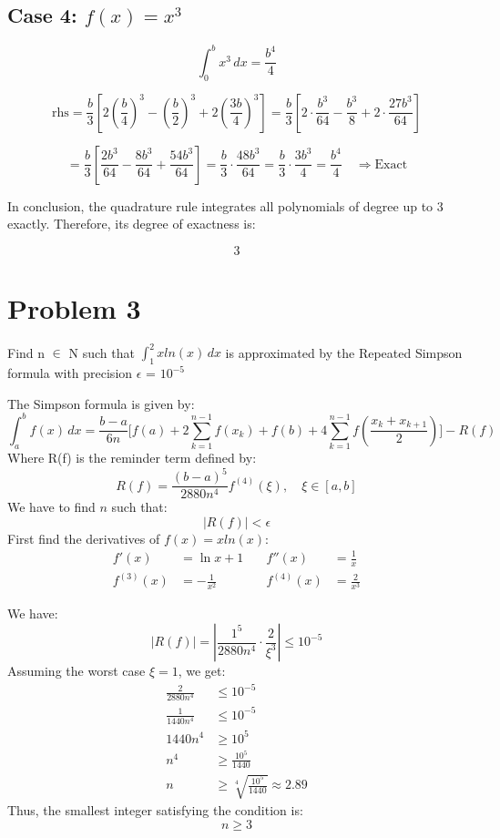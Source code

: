 \documentclass{article}
\begin{document}
\subsection*{Case 4: \( f(x) = x^3 \)}

\[
\int_{0}^{b} x^3\, dx = \frac{b^4}{4}
\]

\[
\text{rhs} = \frac{b}{3} \left[ 2\left( \frac{b}{4} \right)^3 - \left( \frac{b}{2} \right)^3 + 2\left( \frac{3b}{4} \right)^3 \right]
= \frac{b}{3} \left[ 2\cdot\frac{b^3}{64} - \frac{b^3}{8} + 2\cdot\frac{27b^3}{64} \right]
\]

\[
= \frac{b}{3} \left[ \frac{2b^3}{64} - \frac{8b^3}{64} + \frac{54b^3}{64} \right]
= \frac{b}{3} \cdot \frac{48b^3}{64} = \frac{b}{3} \cdot \frac{3b^3}{4}
= \frac{b^4}{4}
\quad \Rightarrow \text{Exact}
\]

In conclusion, the quadrature rule integrates all polynomials of degree up to 3 exactly. Therefore, its degree of exactness is:

\[
\boxed{3}
\]

\section*{Problem 3}
Find n \(\in\) N such that \( \int_{1}^{2} xln(x) \, dx \) is approximated by the Repeated Simpson formula with precision \(\epsilon\) = \(10^{-5}\)
\

The Simpson formula is given by:
\[
    \int_{a}^{b} f(x) \, dx = \frac{b-a}{6n} \bigg[f(a) + 2\sum_{k=1}^{n-1}f(x_k) + f(b) + 4\sum_{k=1}^{n-1}f(\frac{x_k + x_{k+1}}{2})\bigg] - R(f)
\]
Where R(f) is the reminder term defined by:
\[
    R(f) = \frac{(b-a)^5}{2880n^4}f^{(4)}(\xi), \quad \xi \in [a,b]
\]
We have to find \( n \) such that:
\[
    \big|R(f)\big| < \epsilon
\]
First find the derivatives of \( f(x) = xln(x) \):
\begin{align*}
f'(x) &= \ln x + 1 &\quad f''(x) &= \frac{1}{x} \\
f^{(3)}(x) &= -\frac{1}{x^2} &\quad f^{(4)}(x) &= \frac{2}{x^3}
\end{align*}

We have:
\[
    \left|R(f)\right| = \left| \frac{1^5}{2880n^4} \cdot \frac{2}{\xi^3} \right| \leq 10^{-5}
\]
Assuming the worst case \( \xi = 1 \), we get:
\begin{align*}
    \frac{2}{2880n^4} &\leq 10^{-5} \\
    \frac{1}{1440n^4} &\leq 10^{-5} \\
    1440n^4 &\geq 10^5 \\
    n^4 &\geq \frac{10^5}{1440} \\
    n &\geq \sqrt[4]{\frac{10^5}{1440}} \approx 2.89
\end{align*}
Thus, the smallest integer satisfying the condition is:
\[
    \boxed{n \geq 3}
\]
\end{document}
